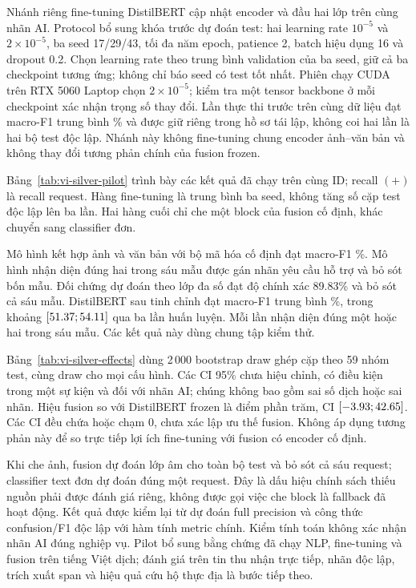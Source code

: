 Nhánh riêng fine-tuning DistilBERT cập nhật encoder và đầu hai lớp trên cùng nhãn AI. Protocol bổ sung khóa trước dự đoán test: hai learning rate $10^{-5}$ và $2\times10^{-5}$, ba seed 17/29/43, tối đa năm epoch, patience 2, batch hiệu dụng 16 và dropout 0.2. Chọn learning rate theo trung bình validation của ba seed, giữ cả ba checkpoint tương ứng; không chỉ báo seed có test tốt nhất. Phiên chạy CUDA trên RTX 5060 Laptop chọn $2\times10^{-5}$; kiểm tra một tensor backbone ở mỗi checkpoint xác nhận trọng số thay đổi. Lần thực thi trước trên cùng dữ liệu đạt macro-F1 trung bình \VISilverPreviousFineFOne\% và được giữ riêng trong hồ sơ tái lập, không coi hai lần là hai bộ test độc lập. Nhánh này không fine-tuning chung encoder ảnh--văn bản và không thay đổi tương phản chính của fusion frozen.

Bảng~\ref{tab:vi-silver-pilot} trình bày các kết quả đã chạy trên cùng \VISilverTestN{} ID; recall $(+)$ là recall request. Hàng fine-tuning là trung bình ba seed, không tăng số cặp test độc lập lên ba lần. Hai hàng cuối chỉ che một block của fusion cố định, khác chuyển sang classifier đơn.



Mô hình kết hợp ảnh và văn bản với bộ mã hóa cố định đạt macro-F1 \VISilverFusionFOne\%. Mô hình nhận diện đúng hai trong sáu mẫu được gán nhãn yêu cầu hỗ trợ và bỏ sót bốn mẫu. Đối chứng dự đoán theo lớp đa số đạt độ chính xác 89.83\% và bỏ sót cả sáu mẫu. DistilBERT sau tinh chỉnh đạt macro-F1 trung bình \VISilverFineFOne\%, trong khoảng $[51.37;54.11]$ qua ba lần huấn luyện. Mỗi lần nhận diện đúng một hoặc hai trong sáu mẫu. Các kết quả này dùng chung tập kiểm thử.

Bảng~\ref{tab:vi-silver-effects} dùng 2\,000 bootstrap draw ghép cặp theo 59 nhóm test, cùng draw cho mọi cấu hình. Các CI 95\% chưa hiệu chỉnh, có điều kiện trong một sự kiện và đối với nhãn AI; chúng không bao gồm sai số dịch hoặc sai nhãn. Hiệu fusion so với DistilBERT frozen là \VISilverFusionTextDelta{} điểm phần trăm, CI $[-3.93;42.65]$. Các CI đều chứa hoặc chạm 0, chưa xác lập ưu thế fusion. Không áp dụng tương phản này để so trực tiếp lợi ích fine-tuning với fusion có encoder cố định.



Khi che ảnh, fusion dự đoán lớp âm cho toàn bộ test và bỏ sót cả sáu request; classifier text đơn dự đoán đúng một request. Đây là dấu hiệu chính sách thiếu nguồn phải được đánh giá riêng, không được gọi việc che block là fallback đã hoạt động. Kết quả được kiểm lại từ dự đoán full precision và công thức confusion/F1 độc lập với hàm tính metric chính. Kiểm tính toán không xác nhận nhãn AI đúng nghiệp vụ. Pilot bổ sung bằng chứng đã chạy NLP, fine-tuning và fusion trên tiếng Việt dịch; đánh giá trên tin thu nhận trực tiếp, nhãn độc lập, trích xuất span và hiệu quả cứu hộ thực địa là bước tiếp theo.
